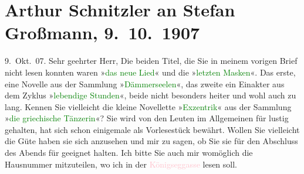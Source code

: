 

               \section[Arthur Schnitzler an Stefan Großmann, 9. 10. 1907]{ Arthur Schnitzler an Stefan Großmann, 9. 10. 1907}\nopagebreak{}\rehead{ }\normalsize\beginnumbering{} \toendnotes[C]{\smallbreak\pagebreak[2]} 
\toendnotes[C]{\smallbreak}\pstart
           \raggedleft{}{\pb}9. Okt. 07. \pend
           \pstart{}Sehr geehrter Herr,\pend\pstart
           Die beiden Titel, die Sie in meinem vorigen Brief nicht lesen konnten waren »\textcolor{green}{das neue Lied}{}\ledrightnote{\textcolor{green}{Das neue Lied}}« und die »\textcolor{green}{letzten Masken}{}\ledrightnote{\textcolor{green}{Die letzten Masken}}«. Das erste, eine Novelle aus der Sammlung
                        »\textcolor{green}{Dämmerseelen}{}\ledrightnote{\textcolor{green}{Die Fremde}}«, das zweite ein Einakter
                    aus dem Zyklus »\textcolor{green}{lebendige Stunden}{}\ledrightnote{\textcolor{green}{Lebendige Stunden. Vier Einakter}}«, beide
                    nicht besonders heiter und wohl auch zu lang.\pend
           \pstart
           Kennen Sie vielleicht die kleine Novellette »\textcolor{green}{Exzentrik}{}\ledrightnote{\textcolor{green}{Excentric}}« aus der Sammlung »\textcolor{green}{die
                        griechische Tänzerin}{}\ledrightnote{\textcolor{green}{Die griechische Tänzerin. Novellette}}«? Sie wird von den Leuten im Allgemeinen für
                    lustig gehalten, hat sich schon einigemale als Vorlesestück bewährt. Wollen Sie
                    vielleicht die Güte haben sie sich anzusehen und mir zu sagen, ob Sie sie für
                    den Abschluss des Abends für geeignet halten.\pend
           \pstart
           Ich bitte Sie auch mir womöglich die Hausnummer mitzuteilen, wo ich in der \textcolor{pink}{Königseggasse}{}\ledrightnote{\textcolor{pink}{Königseggasse}} lesen soll.\pend
